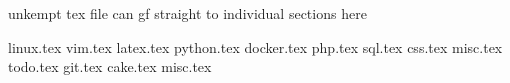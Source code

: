 \newcommand{\code}[1]{\texttt{#1}}
unkempt tex file can gf straight to individual sections here

linux.tex
vim.tex
latex.tex
python.tex
docker.tex
php.tex
sql.tex
css.tex
misc.tex
todo.tex
git.tex
cake.tex
misc.tex
